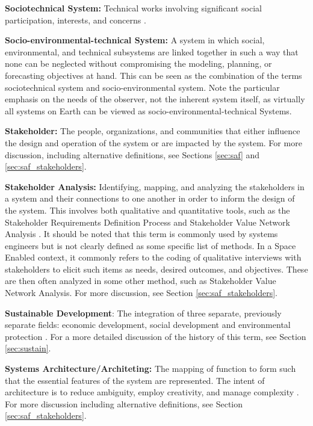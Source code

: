 \textbf{Sociotechnical System:} Technical works involving significant social participation, interests, and concerns \cite{maierArtSystemsArchitecting2009}.

\textbf{Socio-environmental-technical System:} A system in which social, environmental, and technical subsystems are linked together in such a way that none can be neglected without compromising the modeling, planning, or forecasting objectives at hand. This can be seen as the combination of the terms sociotechnical system and socio-environmental system. Note the particular emphasis on the needs of the observer, not the inherent system itself, as virtually all systems on Earth can be viewed as socio-environmental-technical Systems.

\textbf{Stakeholder:} The people, organizations, and communities that either influence the design and operation of the system or are impacted by the system. For more discussion, including alternative definitions, see Sections \ref{sec:saf} and \ref{sec:saf_stakeholders}.

\textbf{Stakeholder Analysis:} Identifying, mapping, and analyzing the stakeholders in a system and their connections to one another in order to inform the design of the system. This involves both qualitative and quantitative tools, such as the Stakeholder Requirements Definition Process \cite{incoseINCOSESystemsEngineering2015} and Stakeholder Value Network Analysis \cite{fengDependencyStructureMatrix2010a}. It should be noted that this term is commonly used by systems engineers but is not clearly defined as some specific list of methods. In a Space Enabled context, it commonly refers to the coding of qualitative interviews with stakeholders to elicit such items as needs, desired outcomes, and objectives. These are then often analyzed in some other method, such as Stakeholder Value Network Analysis. For more discussion, see Section \ref{sec:saf_stakeholders}.

\textbf{Sustainable Development}: The integration of three separate, previously separate fields: economic development, social development and environmental protection \cite{worldsummitonsustainabledevelopmentPlanImplementationWorld2002}.  For a more detailed discussion of the history of this term, see Section \ref{sec:sustain}.

\textbf{Systems Architecture/Architeting:} The mapping of function to form such that the essential features of the system are represented. The intent of architecture is to reduce ambiguity, employ creativity, and manage complexity \cite{crawleySystemArchitectureStrategy2015}. For more discussion including alternative definitions, see Section \ref{sec:saf_stakeholders}.

